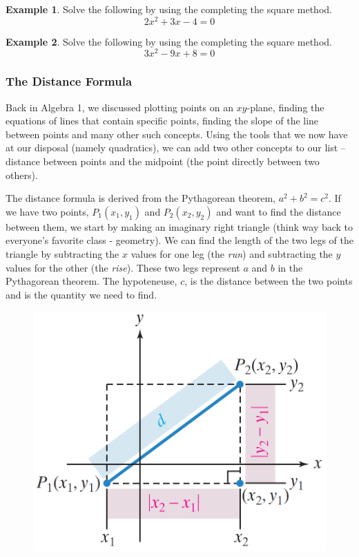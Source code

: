 \documentclass[addpoints,12pt]{exam}
\theoremstyle{definition}
\theoremstyle{break}
\theoremstyle{break}
\newtheorem{example}{Example}[subsection]
\begin{document}
\newpage
\begin{example}
Solve the following by using the completing the square method.
\[ 2x^2 + 3x - 4 = 0\]
\vspace{3in}
\end{example}

\begin{example}
Solve the following by using the completing the square method.
\[ 3x^2 - 9x + 8 = 0\]
\end{example}

\newpage

\subsubsection*{The Distance Formula}
Back in Algebra 1, we discussed plotting points on an $xy$-plane, finding the equations of lines that contain specific points, finding the slope of the line between points and many other such concepts. Using the tools that we now have at our disposal (namely quadratics), we can add two other concepts to our list -- distance between points and the midpoint (the point directly between two others).

\vspace{.2in}

The distance formula is derived from the Pythagorean theorem, $a^2 + b^2 = c^2$. If we have two points, $P_1(x_1,y_1)$ and $P_2(x_2,y_2)$ and want to find the distance between them, we start by making an imaginary right triangle (think way back to everyone's favorite class - geometry). We can find the length of the two legs of the triangle by subtracting the $x$ values for one leg (the \emph{run}) and subtracting the $y$ values for the other (the \emph{rise}). These two legs represent $a$ and $b$ in the Pythagorean theorem. The hypoteneuse, $c$, is the distance between the two points and is the quantity we need to find.

\vspace{.2in}
\begin{figure}[h]
\centering
\includegraphics[scale=.25]{images/11_1_pyth_distance}
\end{figure}
\end{document}
